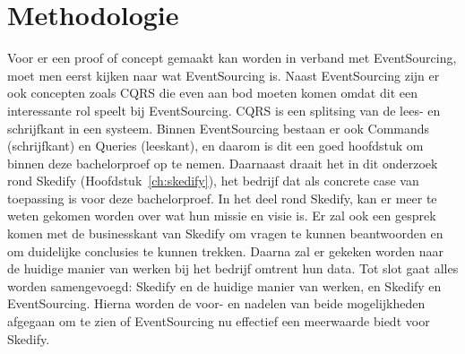 
\chapter{Methodologie}
\label{ch:methodologie}



Voor er een proof of concept gemaakt kan worden in verband met EventSourcing, moet men eerst kijken naar wat EventSourcing is. Naast EventSourcing zijn er ook concepten zoals \gls{CQRS} die even aan bod moeten komen omdat dit een interessante rol speelt bij EventSourcing. \gls{CQRS} is een splitsing van de lees- en schrijfkant in een systeem. Binnen EventSourcing bestaan er ook Commands (schrijfkant) en Queries (leeskant), en daarom is dit een goed hoofdstuk om binnen deze bachelorproef op te nemen. Daarnaast draait het in dit onderzoek rond Skedify (Hoofdstuk~\ref{ch:skedify}), het bedrijf dat als concrete case van toepassing is voor deze bachelorproef. In het deel rond Skedify, kan er meer te weten gekomen worden over wat hun missie en visie is. Er zal ook een gesprek komen met de businesskant van Skedify om vragen te kunnen beantwoorden en om duidelijke conclusies te kunnen trekken. Daarna zal er gekeken worden naar de huidige manier van werken bij het bedrijf omtrent hun data. Tot slot gaat alles worden samengevoegd: Skedify en de huidige manier van werken, en Skedify en EventSourcing. Hierna worden de voor- en nadelen van beide mogelijkheden afgegaan om te zien of EventSourcing nu effectief een meerwaarde biedt voor Skedify.
